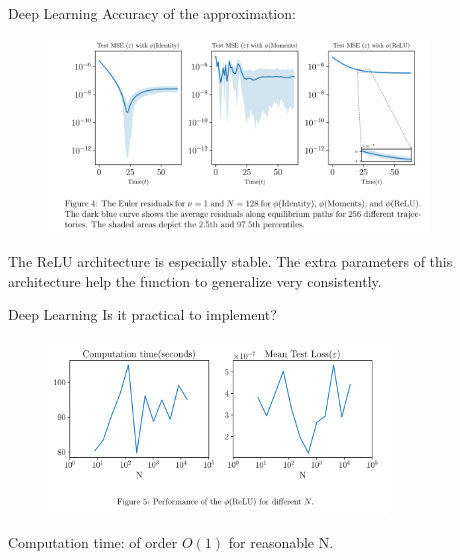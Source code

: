 \documentclass[dvipsnames,mathserif]{beamer}
\begin{document}
{\begin{frame}{Deep Learning}
Accuracy of the approximation:
\begin{figure}[h!]
\centering
\includegraphics[width = 0.9\textwidth]{4.png}
\end{figure}
The ReLU architecture is especially stable. The extra parameters of this architecture help the function to generalize very consistently.
\end{frame}

\begin{frame}{Deep Learning}
Is it practical to implement?
\begin{figure}[h!]
\centering
\includegraphics[width = 0.8\textwidth]{5.png}
\end{figure}
Computation time: of order $O(1)$ for reasonable N.
\end{frame}

}
\end{document}
